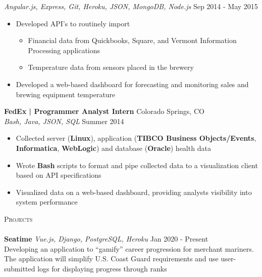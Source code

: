 \documentclass[a4paper]{article}
\newcommand{\lineunder} {
    \vspace*{-8pt} \\
    \hspace*{-18pt} \hrulefill \\
}
\newcommand{\header} [1] {
    {\hspace*{-18pt}\vspace*{6pt} \textsc{#1}}
    \vspace*{-6pt} \lineunder
}
\begin{document}
\textsl{Angular.js, Express, Git, Heroku, JSON, MongoDB, Node.js} \hfill Sep 2014 - May 2015\\
\vspace{-1mm}
\begin{itemize} \itemsep 1pt
	\item  Developed API’s to routinely import 
	\begin{itemize} \itemsep 1pt
		\item Financial data from Quickbooks, Square, and Vermont Information Processing applications 
		\item Temperature data from sensors placed in the brewery
	\end{itemize}
	\item  Developed a web-based dashboard for forecasting and monitoring sales and brewing equipment temperature
\end{itemize}
\textbf{FedEx | Programmer Analyst Intern} \hfill Colorado Springs, CO\\
\textsl{Bash, Java, JSON, SQL} \hfill Summer 2014\\
\vspace{-1mm}
\begin{itemize} \itemsep 1pt
	\item  Collected server (\textbf{Linux}), application (\textbf{TIBCO Business Objects/Events}, \textbf{Informatica}, \textbf{WebLogic}) and database (\textbf{Oracle}) health data
	\item  Wrote \textbf{Bash} scripts to format and pipe collected data to a visualization client based on API specifications
	\item  Visualized data on a web-based dashboard, providing analysts visibility into system performance
\end{itemize}



\header{Projects}
\textbf{Seatime} \hfill
\textsl{Vue.js, Django, PostgreSQL, Heroku} \hfill Jan 2020 - Present\\
\vspace{2mm}
Developing an application to “gamify” career progression for merchant mariners. The application will simplify U.S. Coast Guard requirements and use user-submitted logs for displaying progress through ranks

\ 
\end{document}
